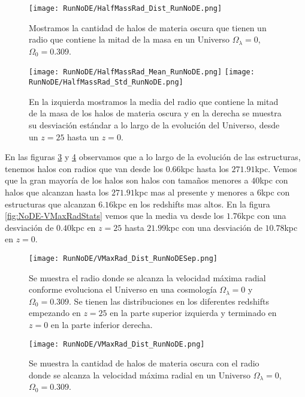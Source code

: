 \begin{figure}[H]
    \centering
    \texttt{[image: RunNoDE/HalfMassRad\_Dist\_RunNoDE.png]}
    \caption[Distribución del radio que contiene la mitad de la masa]{\footnotesize Mostramos la cantidad de halos de materia oscura que tienen un radio que contiene la mitad de la masa en un Universo $\Omega_\lambda = 0$, $\Omega_0 = 0.309$.}
    \label{fig:NoDE-HalfMassRadDist}
\end{figure}

\begin{figure}[H]
    \centering
    \texttt{[image: RunNoDE/HalfMassRad\_Mean\_RunNoDE.png]}
    \texttt{[image: RunNoDE/HalfMassRad\_Std\_RunNoDE.png]}
    \caption[Media y desviación estándar del radio de la mitad de la masa]{\footnotesize En la izquierda mostramos la media del radio que contiene la mitad de la masa de los halos de materia oscura y en la derecha se muestra su desviación estándar a lo largo de la evolución del Universo, desde un $z=25$ hasta un $z=0$.}
    \label{fig:NoDE-HalfMassRadStats}
\end{figure}

En las figuras \ref{fig:NoDE-VMaxRadDistSep} y \ref{fig:NoDE-VMaxRadDist} observamos que a lo largo de la evolución de las estructuras, tenemos halos con radios que van desde los $0.66$kpc hasta los $271.91$kpc. Vemos que la gran mayoría de los halos son halos con tamaños menores a $40$kpc con halos que alcanzan hasta los $271.91$kpc mas al presente y menores a $6$kpc con estructuras que alcanzan $6.16$kpc en los redshifts mas altos. En la figura \ref{fig:NoDE-VMaxRadStats} vemos que la media va desde los $1.76$kpc con una desviación de $0.40$kpc en $z=25$ hasta $21.99$kpc con una desviación de $10.78$kpc en $z=0$.

\begin{figure}[H]
    \centering
    \texttt{[image: RunNoDE/VMaxRad\_Dist\_RunNoDESep.png]}
    \caption[Radio donde se alcanza la velocidad máxima radial]{\footnotesize Se muestra el radio donde se alcanza la velocidad máxima radial conforme evoluciona el Universo en una cosmología $\Omega_\lambda = 0$ y $\Omega_0 = 0.309$. Se tienen las distribuciones en los diferentes redshifts empezando en $z=25$ en la parte superior izquierda y terminado en $z=0$ en la parte inferior derecha.}
    \label{fig:NoDE-VMaxRadDistSep}
\end{figure}

\begin{figure}[H]
    \centering
    \texttt{[image: RunNoDE/VMaxRad\_Dist\_RunNoDE.png]}
    \caption[Distribución del radio donde se alcanza la velocidad máxima radial]{\footnotesize Se muestra la cantidad de halos de materia oscura con el radio donde se alcanza la velocidad máxima radial en un Universo $\Omega_\lambda = 0$, $\Omega_0 = 0.309$.}
    \label{fig:NoDE-VMaxRadDist}
\end{figure}

